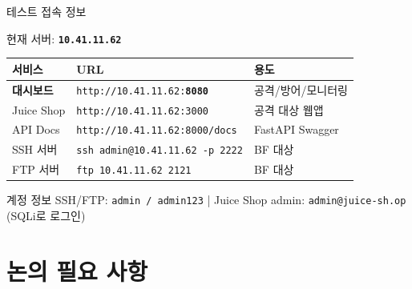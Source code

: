 \documentclass[aspectratio=169,10pt]{beamer}
\newcommand{\hlt}[1]{\textcolor{accent}{\textbf{#1}}}
\begin{document}
\begin{frame}{테스트 접속 정보}
\begin{center}
\large
현재 서버: \texttt{\textbf{10.41.11.62}}
\end{center}

\vspace{0.5em}
\begin{table}[h]
\centering
\begin{tabular}{lll}
\toprule
\textbf{서비스} & \textbf{URL} & \textbf{용도} \\
\midrule
\textbf{대시보드} & \texttt{http://10.41.11.62:\hlt{8080}} & 공격/방어/모니터링 \\
Juice Shop & \texttt{http://10.41.11.62:3000} & 공격 대상 웹앱 \\
API Docs & \texttt{http://10.41.11.62:8000/docs} & FastAPI Swagger \\
SSH 서버 & \texttt{ssh admin@10.41.11.62 -p 2222} & BF 대상 \\
FTP 서버 & \texttt{ftp 10.41.11.62 2121} & BF 대상 \\
\bottomrule
\end{tabular}
\end{table}

\vspace{0.3em}
\begin{block}{계정 정보}
SSH/FTP: \texttt{admin / admin123} \quad|\quad
Juice Shop admin: \texttt{admin@juice-sh.op} (SQLi로 로그인)
\end{block}
\end{frame}

\section{논의 필요 사항}
\end{document}
